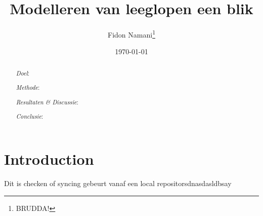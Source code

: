 \documentclass{scrartcl}
\title{Modelleren van leeglopen een blik}
\author{Fidon Namani\thanks{BRUDDA!}}
\date{\today}
\begin{document}
\maketitle
\begin{abstract}
    \textit{Doel}:

    \textit{Methode}:

    \textit{Resultaten \& Discussie}:

    \textit{Conclusie}:
\end{abstract}
\section{Introduction}
Dit is checken of syncing gebeurt vanaf een local repositorsdnasdasldbsay
\end{document}
